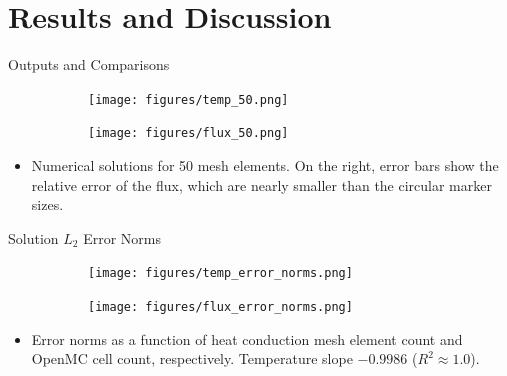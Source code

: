\documentclass[9pt,t]{beamer}
\begin{document}
\section{Results and Discussion}
\begin{frame}{Outputs and Comparisons}
    \pause
    \begin{figure}[T]
        \hspace*{-1cm}
        \begin{subfigure}[b]{0.495\linewidth}
            \centering
            \texttt{[image: figures/temp\_50.png]}
        \end{subfigure}\hspace*{0.6cm}
        \begin{subfigure}[b]{0.495\linewidth}
        \centering
            \texttt{[image: figures/flux\_50.png]}
        \end{subfigure}
    \end{figure}
    \begin{itemize}
        \item Numerical solutions for 50 mesh elements. On the right, error bars show the relative error of the flux, which are nearly smaller than the circular marker sizes.
    \end{itemize}
\end{frame}

\begin{frame}{Solution $L_{2}$ Error Norms}
    \pause
    \begin{figure}[T]
        \hspace*{-0.9cm}
        \begin{subfigure}{0.4995\linewidth}
            \texttt{[image: figures/temp\_error\_norms.png]}
        \end{subfigure}\hspace*{0.85cm}
        \begin{subfigure}{0.4995\linewidth}
            \texttt{[image: figures/flux\_error\_norms.png]}
        \end{subfigure}
    \end{figure}
    \begin{itemize}
        \item Error norms as a function of heat conduction mesh element count and OpenMC cell count, respectively. Temperature slope $-0.9986$ ($R^2\approx1.0$).
    \end{itemize}
\end{frame}
\end{document}
